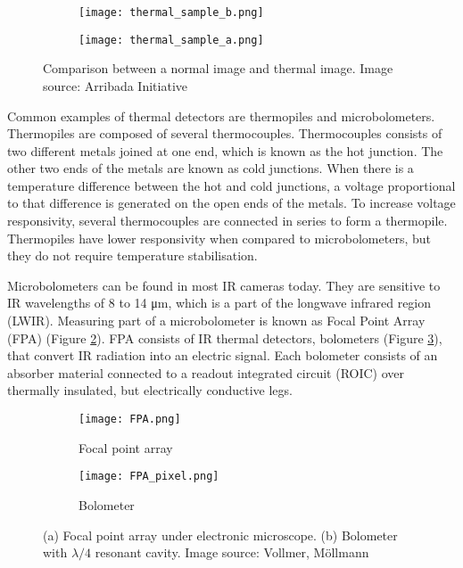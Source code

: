 \begin{figure}[ht]
    \begin{subfigure}{0.5\textwidth}
        \centering
        \texttt{[image: thermal\_sample\_b.png]} 
    \end{subfigure}
    \begin{subfigure}{0.5\textwidth}
        \centering
        \texttt{[image: thermal\_sample\_a.png]}
    \end{subfigure}
    \caption[Comparison between a normal image and thermal image]{Comparison between a normal image and thermal image. Image source: Arribada Initiative\cite{thermal_comparison}}
    \label{thermal_comparison}
\end{figure}

Common examples of thermal detectors are thermopiles and microbolometers. 
Thermopiles are composed of several thermocouples.
Thermocouples consists of two different metals joined at one end, which is known as the hot junction.
The other two ends of the metals are known as cold junctions.
When there is a temperature difference between the hot and cold junctions, a voltage proportional to that difference is generated on the open ends of the metals.
To increase voltage responsivity, several thermocouples are connected in series to form a thermopile\cite{thermal_book}.
Thermopiles have lower responsivity when compared to microbolometers, but they do not require temperature stabilisation\cite{thermal_book}.

Microbolometers can be found in most IR cameras today\cite{thermal_book}. 
They are sensitive to IR wavelengths of 8 to 14 \si{\micro\meter}, which is a part of the longwave infrared region (LWIR)\cite{thermal_book}.
Measuring part of a microbolometer is known as Focal Point Array (FPA) (Figure \ref{FPA}).
FPA consists of IR thermal detectors, bolometers (Figure \ref{FPA_pixel}), that convert IR radiation into an electric signal.
Each bolometer consists of an absorber material connected to a readout integrated circuit (ROIC) over thermally insulated, but electrically conductive legs\cite{thermal_article}.
\newline

\begin{figure}[h]
    \begin{subfigure}{0.5\textwidth}
        \centering
        \texttt{[image: FPA.png]} 
        \caption{Focal point array}
        \label{FPA}
    \end{subfigure}
    \begin{subfigure}{0.5\textwidth}
        \centering
        \texttt{[image: FPA\_pixel.png]}
        \caption{Bolometer}
        \label{FPA_pixel}
    \end{subfigure}
    \caption[Focal point array and bolometer.] {(a) Focal point array under electronic microscope. (b) Bolometer with $\lambda /4$ resonant cavity. Image source: Vollmer, Möllmann\cite{thermal_book}}
    \label{FPA_microbolo}
\end{figure}

